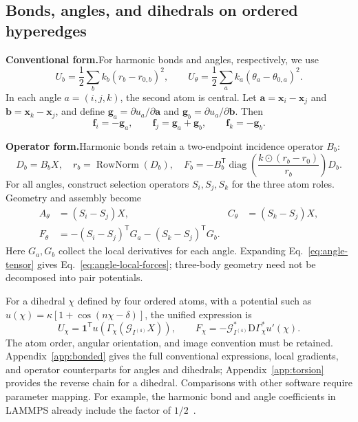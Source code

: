 \documentclass[11pt,a4paper]{article}
\newcommand{\oldform}{\par\noindent\textbf{Conventional form.}\quad}
\newcommand{\newform}{\par\noindent\textbf{Operator form.}\quad}
\newcommand{\ones}{\mathbf 1}
\newcommand{\diag}{\operatorname{diag}}
\newcommand{\vect}[1]{\bm{#1}}
\theoremstyle{definition}
\begin{document}
\subsection{Bonds, angles, and dihedrals on ordered hyperedges}
\label{sec:bonded}
\oldform For harmonic bonds and angles, respectively, we use
\begin{equation}
 U_b=\frac12\sum_b k_b(r_b-r_{0,b})^2,\qquad
 U_\theta=\frac12\sum_a k_a(\theta_a-\theta_{0,a})^2.
\end{equation}
In each angle $a=(i,j,k)$, the second atom is central. Let
$\vect a=\vect x_i-\vect x_j$ and $\vect b=\vect x_k-\vect x_j$, and define
$\vect g_a=\partial u_a/\partial\vect a$ and $\vect g_b=\partial u_a/\partial\vect b$. Then
\begin{equation}
 \vect f_i=-\vect g_a,\qquad
 \vect f_j=\vect g_a+\vect g_b,\qquad
 \vect f_k=-\vect g_b.
 \label{eq:angle-local-forces}
\end{equation}
\newform Harmonic bonds retain a two-endpoint incidence operator $B_b$:
\begin{equation}
 D_b=B_bX,\quad r_b=\operatorname{RowNorm}(D_b),\quad
 F_b=-B_b^{\mathsf T}\diag\!\left(\frac{k\odot(r_b-r_0)}{r_b}\right)D_b.
\end{equation}
For all angles, construct selection operators $S_i,S_j,S_k$ for the three atom roles. Geometry
and assembly become
\begin{align}
 A_\theta&=(S_i-S_j)X, & C_\theta&=(S_k-S_j)X,\\
 F_\theta&=-(S_i-S_j)^{\mathsf T}G_a-(S_k-S_j)^{\mathsf T}G_b.
 \label{eq:angle-tensor}
\end{align}
Here $G_a,G_b$ collect the local derivatives for each angle. Expanding
Eq.~\eqref{eq:angle-tensor} gives Eq.~\eqref{eq:angle-local-forces}; three-body geometry need
not be decomposed into pair potentials.

For a dihedral $\chi$ defined by four ordered atoms, with a potential such as
$u(\chi)=\kappa[1+\cos(n\chi-\delta)]$, the unified expression is
\begin{equation}
 U_\chi=\ones^{\mathsf T}u\!\left(\Gamma_\chi(\mathcal G_{I^{(4)}}X)\right),\qquad
 F_\chi=-\mathcal G_{I^{(4)}}^*\mathrm D\Gamma_\chi^*u'(\chi).
\end{equation}
The atom order, angular orientation, and image convention must be retained.
Appendix~\ref{app:bonded} gives the full conventional expressions, local gradients, and operator
counterparts for angles and dihedrals; Appendix~\ref{app:torsion} provides the reverse chain for
a dihedral. Comparisons with other software require parameter mapping. For example, the harmonic
bond and angle coefficients in LAMMPS already include the factor of
$1/2$~\cite{lammps-bond,lammps-angle}.
\end{document}
